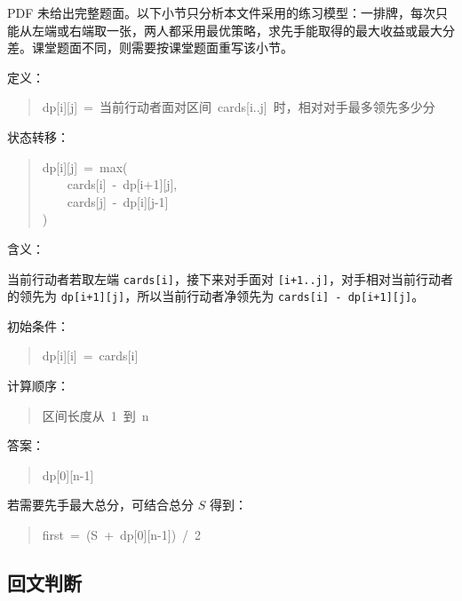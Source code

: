 \documentclass[UTF8,zihao=-4]{ctexart}
\begin{document}
PDF 未给出完整题面。以下小节只分析本文件采用的练习模型：一排牌，每次只能从左端或右端取一张，两人都采用最优策略，求先手能取得的最大收益或最大分差。课堂题面不同，则需要按课堂题面重写该小节。

定义：

\begin{quote}
\small\ttfamily\raggedright
\relax dp[i][j]\ =\ 当前行动者面对区间\ cards[i..j]\ 时，相对对手最多领先多少分\\
\end{quote}

状态转移：

\begin{quote}
\small\ttfamily\raggedright
\relax dp[i][j]\ =\ max(\\
\relax \ \ \ \ cards[i]\ -\ dp[i+1][j],\\
\relax \ \ \ \ cards[j]\ -\ dp[i][j-1]\\
\relax )\\
\end{quote}

含义：

当前行动者若取左端 \texttt{cards[i]}，接下来对手面对 \texttt{[i+1..j]}，对手相对当前行动者的领先为 \texttt{dp[i+1][j]}，所以当前行动者净领先为 \texttt{cards[i] - dp[i+1][j]}。

初始条件：

\begin{quote}
\small\ttfamily\raggedright
\relax dp[i][i]\ =\ cards[i]\\
\end{quote}

计算顺序：

\begin{quote}
\small\ttfamily\raggedright
\relax 区间长度从\ 1\ 到\ n\\
\end{quote}

答案：

\begin{quote}
\small\ttfamily\raggedright
\relax dp[0][n-1]\\
\end{quote}

若需要先手最大总分，可结合总分 $S$ 得到：

\begin{quote}
\small\ttfamily\raggedright
\relax first\ =\ (S\ +\ dp[0][n-1])\ /\ 2\\
\end{quote}

\subsection*{回文判断}
\end{document}
